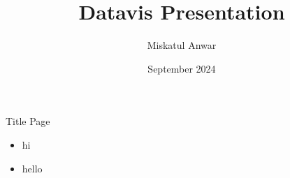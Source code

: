 \documentclass[14pt,aspectratio=169]{beamer}
\title{Datavis Presentation}
\author{Miskatul Anwar}
\date{September 2024}
\begin{document}
\pagecolor{fondpaille}
\color{Maroon}
\setlength{\PreviewBorder}{1em}

\begin{frame}
    \begin{preview}
        
    \end{preview}
\end{frame}

\begin{frame}{Title Page}
    \begin{itemize}
        \item hi
        \item hello
    \end{itemize}
\end{frame}
\end{document}
